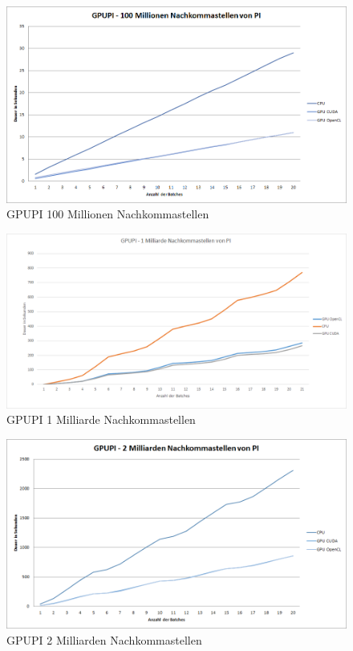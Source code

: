 \begin{figure}[!h]
	\begin{center}
		\includegraphics[width=1.0\linewidth]{images/GPUPI_100M.png}
		\caption{GPUPI 100 Millionen Nachkommastellen}
		\label{GPUPI_100M}
	\end{center}
\end{figure}

\begin{figure}[!h]
	\begin{center}
		\includegraphics[width=1.0\linewidth]{images/GPUPI_1B.png}
		\caption{GPUPI 1 Milliarde Nachkommastellen}
		\label{GPUPI_1B}
	\end{center}
\end{figure}

\begin{figure}[!h]
	\begin{center}
		\includegraphics[width=1.0\linewidth]{images/GPUPI_2B.png}
		\caption{GPUPI 2 Milliarden Nachkommastellen}
		\label{GPUPI_2B}
	\end{center}
\end{figure}

